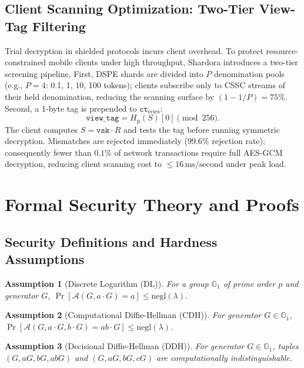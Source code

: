 \documentclass[sigconf,nonacm]{acmart}
\newtheorem{assumption}{Assumption}
\begin{document}
\subsection{Client Scanning Optimization: Two-Tier View-Tag Filtering}
Trial decryption in shielded protocols incurs client overhead. To protect resource-constrained mobile clients under high throughput, Shardora introduces a two-tier screening pipeline. First, DSPE shards are divided into $P$ denomination pools (e.g., $P=4$: 0.1, 1, 10, 100 tokens); clients subscribe only to CSSC streams of their held denomination, reducing the scanning surface by $(1 - 1/P) = 75\%$. Second, a 1-byte tag is prepended to $\mathtt{ct}_{\text{ecies}}$:
\begin{equation}
\mathtt{view\_tag} = H_{\text{p}}(S)[0] \pmod{256}.
\end{equation}
The client computes $S = \mathtt{vsk} \cdot R$ and tests the tag before running symmetric decryption. Mismatches are rejected immediately ($99.6\%$ rejection rate); consequently fewer than $0.1\%$ of network transactions require full AES-GCM decryption, reducing client scanning cost to $\le 16\,\text{ms/second}$ under peak load.

\section{Formal Security Theory and Proofs}

\subsection{Security Definitions and Hardness Assumptions}

\begin{assumption}[Discrete Logarithm (DL)]
For a group $\mathbb{G}_1$ of prime order $p$ and generator $G$, $\Pr[\mathcal{A}(G, a \cdot G) = a] \le \text{negl}(\lambda)$.
\end{assumption}

\begin{assumption}[Computational Diffie-Hellman (CDH)]
For generator $G \in \mathbb{G}_1$, $\Pr[\mathcal{A}(G, a \cdot G, b \cdot G) = ab \cdot G] \le \text{negl}(\lambda)$.
\end{assumption}

\begin{assumption}[Decisional Diffie-Hellman (DDH)]
For generator $G \in \mathbb{G}_1$, tuples $(G, aG, bG, abG)$ and $(G, aG, bG, cG)$ are computationally indistinguishable.
\end{assumption}
\end{document}

